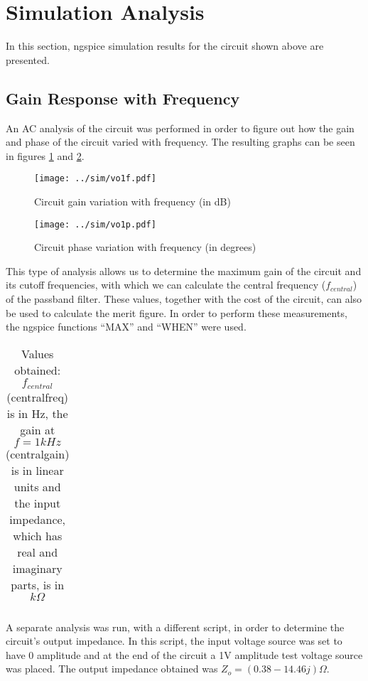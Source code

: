 \section{Simulation Analysis}
\label{sec:simulation}

In this section, ngspice simulation results for the circuit shown above are presented.


\subsection{Gain Response with Frequency}

An AC analysis of the circuit was performed in order to figure out how the gain and phase of the circuit varied with frequency. The resulting graphs can be seen in figures \ref{fig:gain_freq} and \ref{fig:phase_freq}.

\begin{figure}[H] \centering
\texttt{[image: ../sim/vo1f.pdf]}
\caption{Circuit gain variation with frequency (in dB)}
\label{fig:gain_freq}
\end{figure}

\begin{figure}[H] \centering
\texttt{[image: ../sim/vo1p.pdf]}
\caption{Circuit phase variation with frequency (in degrees)}
\label{fig:phase_freq}
\end{figure}

This type of analysis allows us to determine the maximum gain of the circuit and its cutoff frequencies, with which we can calculate the central frequency ($f_{central}$) of the passband filter. These values, together with the cost of the circuit, can also be used to calculate the merit figure. In order to perform these measurements, the ngspice functions ``MAX'' and ``WHEN'' were used.

\begin{table}[H]
  \centering
  \begin{tabular}{|c|c|}
    \hline
      
  \end{tabular}
  \caption{Values obtained: $f_{central}$ (centralfreq) is in Hz, the gain at $f = 1 kHz$ (centralgain) is in linear units and the input impedance, which has real and imaginary parts, is in $k\Omega$}
  \label{tab:resultssim}
\end{table}

A separate analysis was run, with a different script, in order to determine the circuit's output impedance. In this script, the input voltage source was set to have 0 amplitude and at the end of the circuit a 1V amplitude test voltage source was placed. The output impedance obtained was $Z_o = (0.38 - 14.46j) \Omega$.





